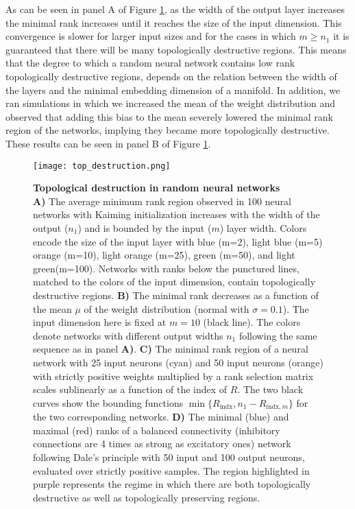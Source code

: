 As can be seen in panel A of Figure \ref{fig:Top destruction}, as the width of the output layer increases the minimal rank increases until it reaches the size of the input dimension. This convergence is slower for larger input sizes and for the cases in which $m \geq n_1$ it is guaranteed that there will be many topologically destructive regions. This means that the degree to which a random neural network contains low rank topologically destructive regions, depends on the relation between the width of the layers and the minimal embedding dimension of a manifold. 
In addition, we ran simulations in which we increased the mean of the weight distribution and observed that adding this bias to the mean severely lowered the minimal rank region of the networks, implying they became more topologically destructive. These results can be seen in panel B of Figure \ref{fig:Top destruction}.


\begin{figure}
    \centering
    \texttt{[image: top\_destruction.png]}
    \caption{\textbf{Topological destruction in random neural networks} \\
    \textbf{A)} The average minimum rank region observed in 100 neural networks with Kaiming initialization increases with the width of the output ($n_1$) and is bounded by the input ($m$) layer width. Colors encode the size of the input layer with blue (m=2), light blue (m=5) orange (m=10), light orange (m=25), green (m=50), and light green(m=100). Networks with ranks below the punctured lines, matched to the colors of the input dimension, contain topologically destructive regions. 
    \textbf{B)} The minimal rank decreases as a function of the mean $\mu$ of the weight distribution (normal with $\sigma=0.1$). The input dimension here is fixed at $m=10$ (black line). The colors denote networks with different output widths $n_1$ following the same sequence as in panel \textbf{A)}.
    \textbf{C)} The minimal rank region of a neural network with 25 input neurons (cyan) and 50 input neurons (orange) with strictly positive weights multiplied by a rank selection matrix scales sublinearly as a function of the index of $R$. The two black curves show the bounding functions $\min\{R_{\text{indx}}, n_1-R_{\text{indx},m}\}$ for the two corresponding networks.
    \textbf{D)} The minimal (blue) and maximal (red) ranks of a balanced connectivity (inhibitory connections are 4 times as strong as excitatory ones) network following Dale's principle with 50 input and 100 output neurons, evaluated over strictly positive samples. The region highlighted in purple represents the regime in which there are both topologically destructive as well as topologically preserving regions.}
    \label{fig:Top destruction}
\end{figure}










